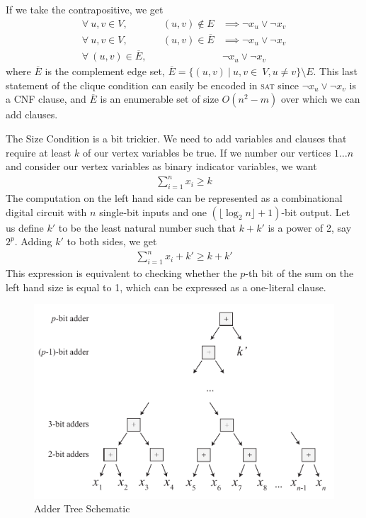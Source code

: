 \documentclass[]{article}
\newcommand{\sat}{\textsc{sat}}
\begin{document}
	If we take the contrapositive, we get
	\begin{align}
	\forall~u,v \in V,&& (u, v) \notin E &\implies \lnot x_u \lor \lnot x_v \\
	\forall~u,v \in V,&& (u, v) \in \overline{E} &\implies \lnot x_u \lor \lnot x_v\\
	\forall~ (u, v) \in \overline{E},&& &\lnot x_u \lor \lnot x_v
	\end{align}
	where $\overline{E}$ is the complement edge set, $\overline{E} = \{(u, v) ~\vert~ u, v \in~V, u \neq v\} \setminus E$. This last statement of the clique condition can easily be encoded in \sat{} since $\lnot x_u \lor \lnot x_v$ is a CNF clause, and $\overline{E}$ is an enumerable set of size $O(n^2 - m)$ over which we can add clauses.
	
	The Size Condition is a bit trickier. We need to add variables and clauses that require at least $k$ of our vertex variables be true. If we number our vertices $1 \ldots n$ and consider our vertex variables as binary indicator variables, we want
	\begin{align}
	\sum_{i = 1}^{n} x_i \ge k
	\end{align}
	The computation on the left hand side can be represented as a combinational digital circuit with $n$ single-bit inputs and one $(\lfloor\log_2 n\rfloor + 1)$-bit output. Let us define $k'$ to be the least natural number such that $k + k'$ is a power of 2, say $2^p$. Adding $k'$ to both sides, we get 
	\begin{align}
	\sum_{i = 1}^{n} x_i + k' \ge k + k'
	\end{align}
	This expression is equivalent to checking whether the $p$-th bit of the sum on the left hand size is equal to 1, which can be expressed as a one-literal clause.
	
	\begin{figure}[H]
		\caption{Adder Tree Schematic}
		\includegraphics[width=4.5 in]{adder-tree}
		\centering
	\end{figure}
	
\end{document}
